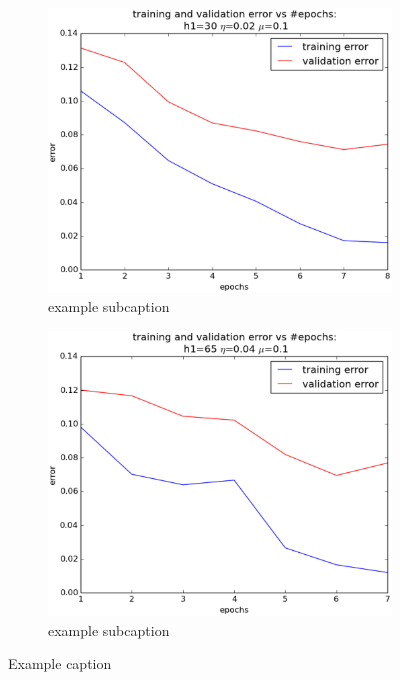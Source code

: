 \begin{itemize}
\begin{figure}[!ht]
\begin{subfigure}[b]{.45\textwidth}
		\label{fig:subfigure2}
		\end{subfigure}
		\quad
		\begin{subfigure}[b]{.45\textwidth}
		\centering
		\includegraphics[width=\textwidth]{mlp/plots/30h1_tuned.eps}
		\caption{example subcaption}
		\label{fig:subfigure1}
		\end{subfigure}
		\quad
		\begin{subfigure}[b]{.45\textwidth}
		\centering
		\includegraphics[width=\textwidth]{mlp/plots/65h1_tuned.eps}
		\caption{example subcaption}
		\label{fig:subfigure3}
		\end{subfigure}	
		\caption{Example caption}
		\label{fig:example}
		\end{figure}

\end{itemize}

